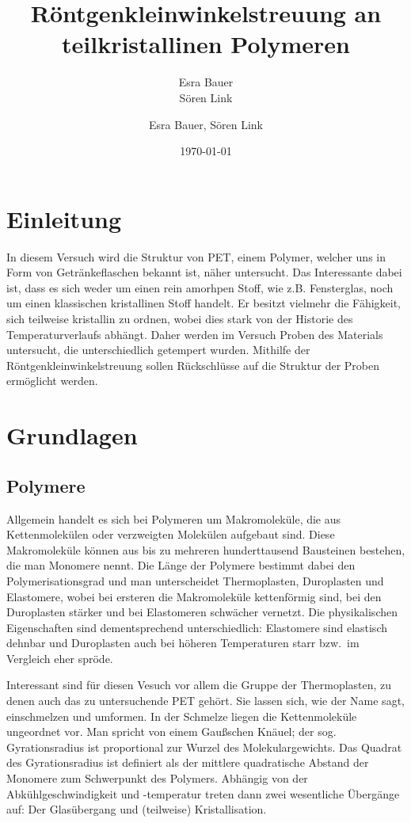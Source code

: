 \documentclass[bigchapter,colorback,accentcolor=tud4b,linedtoc,11pt]{tudreport}
\title{Röntgenkleinwinkelstreuung an teilkristallinen Polymeren}
\subtitle{Esra Bauer  \\Sören Link}
\author{Esra Bauer, Sören Link}
\date{\today}
\begin{document}

\maketitle

\tableofcontents


\chapter{Einleitung}

In diesem Versuch wird die Struktur von PET, einem Polymer, welcher uns in Form von Getränkeflaschen bekannt ist, näher untersucht. Das Interessante dabei ist, dass es sich weder um einen rein amorhpen Stoff, wie z.B. Fensterglas, noch um einen klassischen kristallinen Stoff handelt. Er besitzt vielmehr die Fähigkeit, sich teilweise kristallin zu ordnen, wobei dies stark von der Historie des Temperaturverlaufs abhängt. Daher werden im Versuch Proben des Materials untersucht, die unterschiedlich getempert wurden. Mithilfe der Röntgenkleinwinkelstreuung sollen Rückschlüsse auf die Struktur der Proben ermöglicht werden.

\chapter{Grundlagen}
\section{Polymere}

Allgemein handelt es sich bei Polymeren um Makromoleküle, die aus Kettenmolekülen oder verzweigten Molekülen aufgebaut sind. Diese Makromoleküle können aus bis zu mehreren hunderttausend Bausteinen bestehen, die man Monomere nennt. Die Länge der Polymere bestimmt dabei den Polymerisationsgrad und man unterscheidet Thermoplasten, Duroplasten und Elastomere, wobei bei ersteren die Makromoleküle kettenförmig sind, bei den Duroplasten stärker und bei Elastomeren schwächer vernetzt. Die physikalischen Eigenschaften sind dementsprechend unterschiedlich: Elastomere sind elastisch dehnbar und Duroplasten auch bei höheren Temperaturen starr bzw.\ im Vergleich eher spröde. 

Interessant sind für diesen Vesuch vor allem die Gruppe der Thermoplasten, zu denen auch das zu untersuchende PET gehört. Sie lassen sich, wie der Name sagt, einschmelzen und umformen. In der Schmelze liegen die Kettenmoleküle ungeordnet vor. Man spricht von einem Gaußschen Knäuel; der sog. Gyrationsradius ist proportional zur Wurzel des Molekulargewichts. Das Quadrat des Gyrationsradius ist definiert als der mittlere quadratische Abstand der Monomere zum Schwerpunkt des Polymers. Abhängig von der Abkühlgeschwindigkeit und -temperatur treten dann zwei wesentliche Übergänge auf: Der Glasübergang und (teilweise) Kristallisation.
\end{document}
